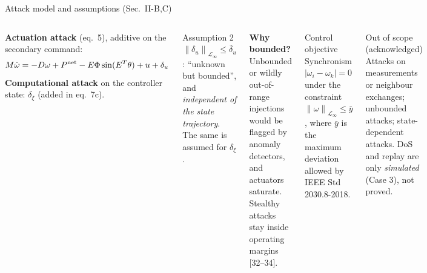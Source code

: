 \documentclass[aspectratio=169,9pt]{beamer}
\newcommand{\norm}[1]{\left\|#1\right\|}
\newcommand{\Linf}{\mathcal{L}_\infty}
\begin{document}
\begin{frame}[t]{Attack model and assumptions (Sec.~II-B,C)}
\footnotesize
\begin{columns}[T]
\textbf{Actuation attack} (eq.~5), additive on the secondary command:
\[M\dot\omega=-D\omega+P^{\rm net}-E\Phi\sin(E^T\theta)+u+\delta_u\]
\textbf{Computational attack} on the controller state: $\delta_\xi$ (added in eq.~7c).
\begin{alertblock}{Assumption 2}
$\norm{\delta_u}_{\Linf}\le\bar\delta_u$: ``unknown but bounded'', and \emph{independent of the state trajectory}. The same is assumed for $\delta_\xi$.
\end{alertblock}
\textbf{Why bounded?} Unbounded or wildly out-of-range injections would be flagged by anomaly detectors, and actuators saturate. Stealthy attacks stay inside operating margins [32--34].
\begin{block}{Control objective}
Synchronism $|\omega_i-\omega_k|=0$ under the constraint $\norm{\omega}_{\Linf}\le\bar y$, where $\bar y$ is the maximum deviation allowed by IEEE Std 2030.8-2018.
\end{block}
\begin{exampleblock}{Out of scope (acknowledged)}
Attacks on measurements or neighbour exchanges; unbounded attacks; state-dependent attacks. DoS and replay are only \emph{simulated} (Case 3), not proved.
\end{exampleblock}
\end{columns}
\end{frame}
\end{document}
